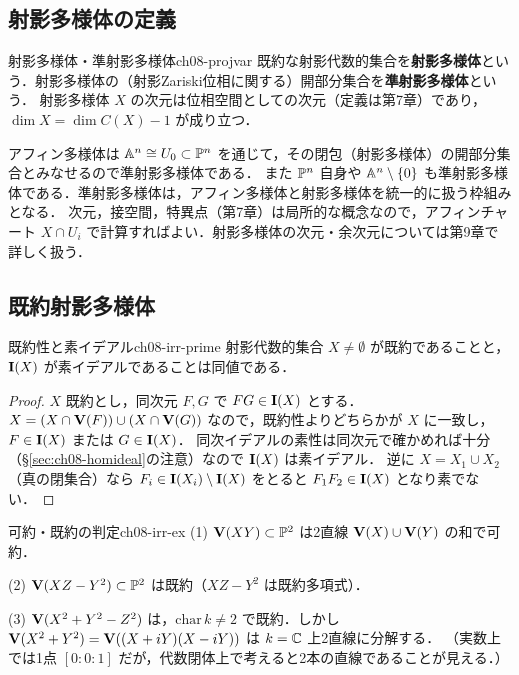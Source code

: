 \subsection{射影多様体の定義}

\begin{mydef}{射影多様体・準射影多様体}{ch08-projvar}
既約な射影代数的集合を\textbf{射影多様体}という．射影多様体の（射影Zariski位相に関する）開部分集合を\textbf{準射影多様体}という．
射影多様体 $X$ の次元は位相空間としての次元（定義は第7章）であり，$\dim X=\dim C(X)-1$ が成り立つ．
\end{mydef}

アフィン多様体は $\mathbb{A}^n\cong U_0\subset\mathbb{P}^n$ を通じて，その閉包（射影多様体）の開部分集合とみなせるので準射影多様体である．
また $\mathbb{P}^n$ 自身や $\mathbb{A}^n\setminus\{0\}$ も準射影多様体である．準射影多様体は，アフィン多様体と射影多様体を統一的に扱う枠組みとなる．
次元，接空間，特異点（第7章）は局所的な概念なので，アフィンチャート $X\cap U_i$ で計算すればよい．射影多様体の次元・余次元については第9章で詳しく扱う．

\subsection{既約射影多様体}

\begin{myprop}{既約性と素イデアル}{ch08-irr-prime}
射影代数的集合 $X\neq\emptyset$ が既約であることと，$\mathbf{I}(X)$ が素イデアルであることは同値である．
\end{myprop}

\begin{proof}
$X$ 既約とし，同次元 $F,G$ で $FG\in\mathbf{I}(X)$ とする．$X=(X\cap\mathbf{V}(F))\cup(X\cap\mathbf{V}(G))$ なので，既約性よりどちらかが $X$ に一致し，$F\in\mathbf{I}(X)$ または $G\in\mathbf{I}(X)$．
同次イデアルの素性は同次元で確かめれば十分（\S\ref{sec:ch08-homideal}の注意）なので $\mathbf{I}(X)$ は素イデアル．
逆に $X=X_1\cup X_2$（真の閉集合）なら $F_i\in\mathbf{I}(X_i)\setminus\mathbf{I}(X)$ をとると $F_1F_2\in\mathbf{I}(X)$ となり素でない．
\end{proof}

\begin{myex}{可約・既約の判定}{ch08-irr-ex}
(1) $\mathbf{V}(XY)\subset\mathbb{P}^2$ は2直線 $\mathbf{V}(X)\cup\mathbf{V}(Y)$ の和で可約．

(2) $\mathbf{V}(XZ-Y^2)\subset\mathbb{P}^2$ は既約（$XZ-Y^2$ は既約多項式）．

(3) $\mathbf{V}(X^2+Y^2-Z^2)$ は，$\mathrm{char}\,k\neq2$ で既約．しかし $\mathbf{V}(X^2+Y^2)=\mathbf{V}((X+iY)(X-iY))$ は $k=\mathbb{C}$ 上2直線に分解する．
（実数上では1点 $[0:0:1]$ だが，代数閉体上で考えると2本の直線であることが見える．）
\end{myex}

